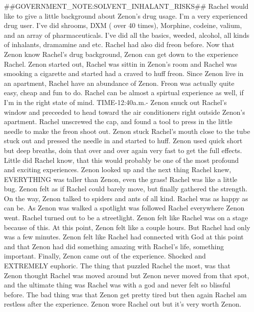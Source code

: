 \documentclass[12pt]{book}
\begin{document}
\#\#GOVERNMENT\_NOTE:SOLVENT\_INHALANT\_RISKS\#\# Rachel would like to give a little background about Zenon's drug usage. I'm a very experienced drug user. I've did shrooms, DXM ( over 40 times), Morphine, codeine, valium, and an array of pharmaceuticals. I've did all the basics, weeded, alcohol, all kinds of inhalants, dramamine and etc. Rachel had also did freon before. Now that Zenon know Rachel's drug background, Zenon can get down to the experience Rachel. Zenon started out, Rachel was sittin in Zenon's room and Rachel was smooking a cigarette and started had a craved to huff freon. Since Zenon live in an apartment, Rachel have an abundance of Zenon. Freon was actually quite easy, cheap and fun to do. Rachel can be almost a spirtual experience as well, if I'm in the right state of mind. TIME-12:40a.m.- Zenon snuck out Rachel's window and preceeded to head toward the air conditioners right outside Zenon's apartment. Rachel unscrewed the cap, and found a tool to press in the little needle to make the freon shoot out. Zenon stuck Rachel's mouth close to the tube stuck out and pressed the needle in and started to huff. Zenon used quick short but deep breaths, doin that over and over again very fast to get the full effects. Little did Rachel know, that this would probably be one of the most profound and exciting experiences. Zenon looked up and the next thing Rachel knew, EVERYTHING was taller than Zenon, even the grass! Rachel was like a little bug. Zenon felt as if Rachel could barely move, but finally gathered the strength. On the way, Zenon talked to spiders and ants of all kind. Rachel was as happy as can be. As Zenon was walked a spotlight was followed Rachel everywhere Zenon went. Rachel turned out to be a streetlight. Zenon felt like Rachel was on a stage because of this. At this point, Zenon felt like a couple hours. But Rachel had only was a few minutes. Zenon felt like Rachel had connected with God at this point and that Zenon had did something amazing with Rachel's life, something important. Finally, Zenon came out of the experience. Shocked and EXTREMELY euphoric. The thing that puzzled Rachel the most, was that Zenon thought Rachel was moved around but Zenon never moved from that spot, and the ultimate thing was Rachel was with a god and never felt so blissful before. The bad thing was that Zenon get pretty tired but then again Rachel am restless after the experience. Zenon wore Rachel out but it's very worth Zenon.
\end{document}
